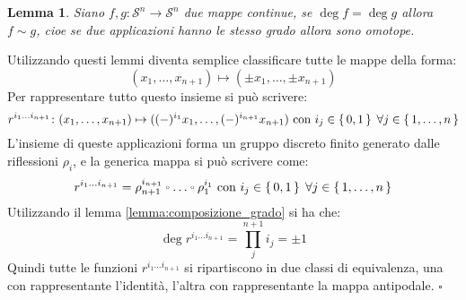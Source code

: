 \documentclass[10pt]{scrartcl}
\newcounter{lemmac}
\newtheorem{lemma}[lemmac]{Lemma}
\newcommand{\Sph}[1][]{\mathcal{S}^#1}
\let\latexcirc=\circ
\newcommand{\ccirc}{\mathbin{\mathchoice
  {\xcirc\scriptstyle}
  {\xcirc\scriptstyle}
  {\xcirc\scriptscriptstyle}
  {\xcirc\scriptscriptstyle}
}}
\newcommand{\xcirc}[1]{\vcenter{\hbox{$#1\latexcirc$}}}
\let\circ\ccirc
\begin{document}
\begin{lemma}
  Siano $ f,g \colon \Sph{n} \to \Sph{n} $ due mappe continue, se
  $ \deg f = \deg g $ allora $ f \sim g $, cioe se due applicazioni
  hanno le stesso grado allora sono omotope.
\end{lemma}
Utilizzando questi lemmi diventa %
semplice classificare tutte le mappe della forma:
\[
  (x_1, \dots, x_{n+1}) \mapsto (\pm x_1, \dots, \pm x_{n+1})
\]
Per rappresentare tutto questo insieme si può scrivere:
\[
   r^{i_1\dots i_{n+1}} \colon (x_1, \dots, x_{n+1}) \mapsto ( (-)^{i_1} x_1, \dots, (-)^{i_{n+1}} x_{n+1}) \text{ con } i_j \in \set{0,1} \; \forall j \in \set{1,\dots, n}
\]
L'insieme di queste applicazioni forma un gruppo discreto finito
generato dalle riflessioni $ \rho_i $, e la generica mappa si può
scrivere come:
\[
  r^{i_1\dots i_{n+1}} = \rho_{n+1}^{i_{n+1}} \circ \dots \circ \rho_{1}^{i_{1}} \text{ con } i_j \in \set{0,1} \; \forall j \in \set{1,\dots, n}
\]
Utilizzando il lemma \ref{lemma:composizione_grado} si ha che:
\[
  \deg r^{i_1\dots i_{n+1}} = \prod_j^{n+1} i_{j} = \pm 1
\]
Quindi tutte le funzioni $ r^{i_1\dots i_{n+1}} $ si ripartiscono in
due classi di equivalenza, una con rappresentante l'identità,
l'altra con rappresentante la mappa antipodale.
\hfill $ \square $
\end{document}
